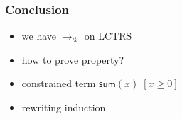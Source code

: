 \documentclass[12pt,aspectratio=169]{beamer}
\newcommand{\m}[1]{\mathsf{#1}}
\newcommand{\RR}{\mathcal{R}}
\begin{document}
\begin{frame}
    \frametitle{Conclusion}
    \begin{itemize}[<+->]
        \item we have $\to_{\RR}$ on LCTRS
            \bigskip
        \item how to prove property?
            \bigskip
        \item constrained term $\m{sum}(x)\; [x \geq 0]$
            \bigskip
        \item rewriting induction
    \end{itemize}
\end{frame}

\begin{comment}


\begin{frame}
    \begin{example}
        \begin{tabular}{ll}
            $\m{sum} : [\m{int}] \Rightarrow \m{int}$ & $\m{sum2} [\m{bool} \times \m{int}] \Rightarrow \m{int}$ \\
            $\m{0} : \m{int}$ & $\m{s} : [\m{int}] \Rightarrow \m{int}$\\
            $\m{true} : \m{bool}$ & $\m{false} :\m{bool}$
        \end{tabular}

        \begin{itemize}
            \item $\m{sum}(\m{0})$
            \item $\m{sum2}(\m{true}, \m{s}(\m{0}))$
            \item $\m{s}(\m{false})$
            \item $\m{sum2}(\m{s}(\m{0}) ,\m{ture})$
        \end{itemize}

    \end{example}
\end{frame}

\begin{frame}
    \begin{example}
    \begin{tabular}{ll}
        $\m{sum}(x) \to \m{sum2}(x) \; [x \bmod 2 = 0]$ & $\m{sum}(x) \to \m{sum2}(x - 1) \; [x \bmod 2 = 1]$\\
        $\m{sum2}(x) \to x + \m{sum2}(x-2) \; [\neg(0 \geq x)]$ & $\m{sum2}(x) \to 0 \; [0 \geq x]$
    \end{tabular}
    \end{example}
    \begin{example}
    \begin{tabular}{l}
        $\m{sum}(x) \to x + \m{sum}(x - \m{2}) \; [\neg(\m{0} \geq x) \land \m{even}(x)]$ \\
        $\m{sum}(x) \to \m{sum}(x - \m{1}) \; [\neg(\m{0} \geq x) \land \neg(\m{even}(x))]$\\
        $\m{sum}(x) \to \m{0} \; [\m{0} \geq x]$
    \end{tabular}


\end{comment}
\end{document}
